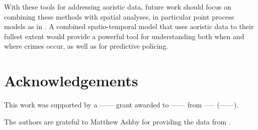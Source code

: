 With these tools for addressing aoristic data, future work should focus on combining these methods with spatial analyses, in particular point process models as in \citet{wang2014modeling}. A combined spatio-temporal model that uses aoristic data to their fullest extent would provide a powerful tool for understanding both when and where crimes occur, as well as for predictive policing.

\section{Acknowledgements}

This work was supported by a ------ grant awarded to ------ from ----- (------).

The authors are grateful to Matthew Ashby for providing the data from \citet{ashby2013comparison}.




\newpage

\appendix
